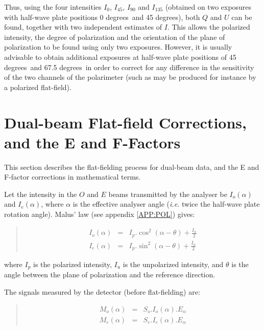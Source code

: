 \documentclass[twoside,11pt]{article}
\newcommand{\hyperref}[4]{#2\ref{#4}#3}
\newcommand{\xlabel}[1]{}
\renewcommand{\_}{\texttt{\symbol{95}}}
\newenvironment{myquote}{\begin{quote}\begin{small}}{\end{small}\end{quote}}
\newcommand{\dgs}{\hbox{$^\circ$}}
\renewcommand{\dgs}{ degrees}
\begin{document}
Thus, using the four intensities $I_{0}$, $I_{45}$, $I_{90}$ and $I_{135}$
(obtained on two exposures with half-wave plate positions 0\dgs\ and
45\dgs), both $Q$ and $U$ can be found, together with two
independent estimates of $I$. This allows the polarized intensity, the
degree of polarization and the orientation of the plane of polarization to
be found using only two exposures. However, it is usually advisable to
obtain additional exposures at half-wave plate positions of 45\dgs\ and
67.5\dgs\ in order to correct for any difference in the sensitivity of
the two channels of the polarimeter (such as may be produced for instance
by a polarized flat-field).

\newpage
\section{\label{APP:FFCOR}\xlabel{flatfieldcorrectionsandtheFFactor}Dual-beam
Flat-field Corrections, and the E and F-Factors}
This section describes the flat-fielding process for dual-beam data, and the 
E and F-factor corrections in mathematical terms.

Let the intensity in the $O$ and $E$ beams transmitted by the analyser be
$I_{o}(\alpha)$ and $I_{e}(\alpha)$, where $\alpha$ is the effective 
analyser angle (\emph{i.e.} twice the half-wave plate rotation angle).
\hyperref{Malus' law}{Malus' law (see appendix }{)}{APP:POL} gives:

\begin{myquote}
\begin{eqnarray*}
  I_{o}(\alpha) & = & I_{p}.\cos^{2}( \alpha - \theta ) + \frac{I_{u}}{2} \\
  I_{e}(\alpha) & = & I_{p}.\sin^{2}( \alpha - \theta ) + \frac{I_{u}}{2} 
\end{eqnarray*}
\end{myquote}

where $I_{p}$ is the polarized intensity, $I_{u}$ is the unpolarized
intensity, and $\theta$ is the angle between the plane of polarization
and the reference direction. 

The signals measured by the detector (before flat-fielding) are:

\begin{myquote}
\begin{eqnarray*}
  M_{o}(\alpha) & = & S_{o}.I_{o}(\alpha).E_{\alpha} \\
  M_{e}(\alpha) & = & S_{e}.I_{e}(\alpha).E_{\alpha}
\end{eqnarray*}
\end{myquote}
\end{document}
